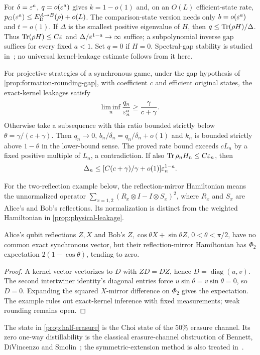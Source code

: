 For $\delta=\varepsilon^a$, $q=o(\varepsilon^a)$ gives $k=1-o(1)$ and, on an $O(L)$ efficient-state rate, $p_G(\varepsilon^a)\le E_{\mathrm D}^{A\to B}(\rho)+o(L)$. The comparison-state version needs only $b=o(\varepsilon^a)$ and $t=o(1)$. If $\Delta$ is the smallest positive eigenvalue of $H$, then $q\le\operatorname{Tr}(\rho H)/\Delta$. Thus $\operatorname{Tr}(\rho H)\le C\varepsilon$ and $\Delta/\varepsilon^{1-a}\to\infty$ suffice; a subpolynomial inverse gap suffices for every fixed $a<1$. Set $q=0$ if $H=0$. Spectral-gap stability is studied in~\cite{dlS22}; no universal kernel-leakage estimate follows from it here.

For projective strategies of a synchronous game, under the gap hypothesis of \cref{prop:formation-rounding-gap}, with coefficient $c$ and efficient original states, the exact-kernel leakages satisfy
\[
 \liminf_n\frac{q_n}{\varepsilon_n^a}\ge\frac\gamma{c+\gamma}.
\]
Otherwise take a subsequence with this ratio bounded strictly below $\theta=\gamma/(c+\gamma)$. Then $q_n\to0$, $b_n/\delta_n=q_n/\delta_n+o(1)$ and $k_n$ is bounded strictly above $1-\theta$ in the lower-bound sense. The proved rate bound exceeds $cL_n$ by a fixed positive multiple of $L_n$, a contradiction. If also $\operatorname{Tr}\rho_nH_n\le C\varepsilon_n$, then
\[
 \Delta_n\le[C(c+\gamma)/\gamma+o(1)]\varepsilon_n^{1-a}.
\]

For the two-reflection example below, the reflection-mirror Hamiltonian means the unnormalized operator $\sum_{x=1,2}(R_x\otimes I-I\otimes S_x)^2$, where $R_x$ and $S_x$ are Alice's and Bob's reflections. Its normalization is distinct from the weighted Hamiltonian in \cref{prop:physical-leakage}.

\begin{proposition}\label{prop:no-exact-kernel}
Alice's qubit reflections $Z,X$ and Bob's $Z,\cos\theta X+\sin\theta Z$, $0<\theta<\pi/2$, have no common exact synchronous vector, but their reflection-mirror Hamiltonian has $\Phi_2$ expectation $2(1-\cos\theta)$, tending to zero.
\end{proposition}
\begin{proof}
A kernel vector vectorizes to $D$ with $ZD=DZ$, hence $D=\operatorname{diag}(u,v)$. The second intertwiner identity's diagonal entries force $u\sin\theta=v\sin\theta=0$, so $D=0$. Expanding the squared $X$-mirror difference on $\Phi_2$ gives the expectation. The example rules out exact-kernel inference with fixed measurements; weak rounding remains open.
\end{proof}

The state in \cref{prop:half-erasure} is the Choi state of the $50\%$ erasure channel. Its zero one-way distillability is the classical erasure-channel obstruction of Bennett, DiVincenzo and Smolin~\cite{BDS97}; the symmetric-extension method is also treated in~\cite{HN05,MCL06}.


